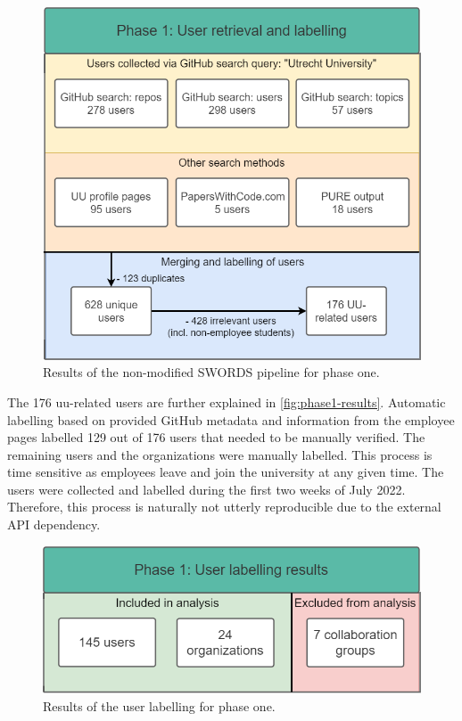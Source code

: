 \begin{figure}[h!]
\centering
\includegraphics[scale=0.50]{figures/SWORDS-thesis-phase1_method_numbers.drawio.png}
\caption{Results of the non-modified SWORDS pipeline for phase one. 
\label{fig:phase1-method}}
\end{figure}

The 176 \acrshort{uu}-related users are further explained in \autoref{fig:phase1-results}.
Automatic labelling based on provided GitHub metadata and information from the employee pages labelled 129 out of 176 users that needed to be manually verified. The remaining users and the organizations were manually labelled. This process is time sensitive as employees leave and join the university at any given time. The users were collected and labelled during the first two weeks of July 2022. Therefore, this process is naturally not utterly reproducible due to the external API dependency.


\begin{figure}[h!]
\centering
\includegraphics[scale=0.45]{figures/SWORDS-thesis-phase1_results.drawio.png}
\caption{Results of the user labelling for phase one.
\label{fig:phase1-results}}
\end{figure}

